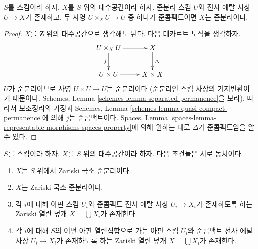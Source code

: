 \begin{lemma}
\label{lemma-quasi-separated}
$S$를 스킴이라 하자. $X$를 $S$ 위의 대수공간이라 하자.
준분리 스킴 $U$와 전사 에탈 사상 $U \to X$가 존재하고,
두 사영 $U \times_X U \to U$ 중 하나가 준콤팩트이면 $X$는 준분리이다.
\end{lemma}

\begin{proof}
$X$를 $\mathbf{Z}$ 위의 대수공간으로 생각해도 된다.
다음 데카르트 도식을 생각하자.
$$
\xymatrix{
U \times_X U \ar[r] \ar[d]_j & X \ar[d]^\Delta \\
U \times U \ar[r] & X \times X
}
$$
$U$가 준분리이므로 사영 $U \times U \to U$는 준분리이다
(준분리인 스킴 사상의 기저변환이기 때문이다. Schemes, Lemma
\ref{schemes-lemma-separated-permanence}을 보라).
따라서 보조정리의 가정과 Schemes, Lemma
\ref{schemes-lemma-quasi-compact-permanence}에 의해 $j$는 준콤팩트이다.
Spaces, Lemma \ref{spaces-lemma-representable-morphisms-spaces-property}에 의해
원하는 대로 $\Delta$가 준콤팩트임을 알 수 있다.
\end{proof}

\begin{lemma}
\label{lemma-quasi-separated-quasi-compact-pieces}
$S$를 스킴이라 하자.
$X$를 $S$ 위의 대수공간이라 하자.
다음 조건들은 서로 동치이다.
\begin{enumerate}
\item $X$는 $S$ 위에서 Zariski 국소 준분리이다.
\item $X$는 Zariski 국소 준분리이다.
\item 각 $i$에 대해 아핀 스킴 $U_i$와 준콤팩트 전사 에탈 사상
$U_i \to X_i$가 존재하도록 하는 Zariski 열린 덮개
$X = \bigcup X_i$가 존재한다.
\item 각 $i$에 대해 $S$의 어떤 아핀 열린집합으로 가는 아핀 스킴
$U_i$와 준콤팩트 전사 에탈 사상 $U_i \to X_i$가 존재하도록 하는
Zariski 열린 덮개 $X = \bigcup X_i$가 존재한다.
\end{enumerate}
\end{lemma}

